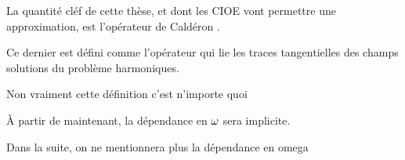 \hypertarget{calderon}{}
\begin{defn}{}
    \label{def:calderon}
    La quantité cléf de cette thèse, et dont les CIOE vont permettre une approximation, est l'opérateur de Caldéron \cite[Def~4, p.~108]{cessenat_mathematical_1996}.

    Ce dernier est défini comme l'opérateur qui lie les traces tangentielles des champs solutions du problème harmoniques.
\end{defn}
\begin{REM}
  Non vraiment cette définition c'est n’importe quoi
\end{REM}

À partir de maintenant, la dépendance en \(\omega\) sera implicite.
\begin{REM}
  Dans la suite, on ne mentionnera plus la dépendance en omega
\end{REM}


